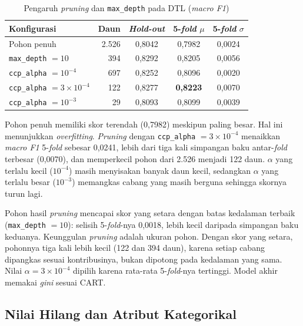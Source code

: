 \begin{table}[H]
	\centering
	\caption{Pengaruh \textit{pruning} dan \texttt{max\_depth} pada DTL (\textit{macro F1})}
	\label{tab:dtl-pruning}
	\begin{tabular}{l r c c c}
		\toprule
		\textbf{Konfigurasi} & \textbf{Daun} & \textbf{\textit{Hold-out}} & \textbf{5-\textit{fold} $\mu$} & \textbf{5-\textit{fold} $\sigma$} \\
		\midrule
		Pohon penuh                                  & 2.526 & 0,8042 & 0,7982 & 0,0024 \\
		\texttt{max\_depth} $=10$                     & 394   & 0,8292 & 0,8205 & 0,0056 \\
		\midrule
		\texttt{ccp\_alpha} $=10^{-4}$                & 697   & 0,8252 & 0,8096 & 0,0020 \\
		\texttt{ccp\_alpha} $=3\times10^{-4}$         & 122   & 0,8277 & \textbf{0,8223} & 0,0070 \\
		\texttt{ccp\_alpha} $=10^{-3}$                & 29    & 0,8093 & 0,8099 & 0,0039 \\
		\bottomrule
	\end{tabular}
\end{table}

Pohon penuh memiliki skor terendah (0,7982) meskipun paling besar. Hal ini
menunjukkan \textit{overfitting}. \textit{Pruning} dengan
\texttt{ccp\_alpha} $=3\times10^{-4}$ menaikkan \textit{macro F1} 5-\textit{fold}
sebesar 0,0241, lebih dari tiga kali simpangan baku antar-\textit{fold} terbesar (0,0070), dan
memperkecil pohon dari 2.526 menjadi 122 daun. $\alpha$ yang terlalu kecil
($10^{-4}$) masih menyisakan banyak daun kecil, sedangkan $\alpha$ yang terlalu
besar ($10^{-3}$) memangkas cabang yang masih berguna sehingga skornya turun lagi.

Pohon hasil \textit{pruning} mencapai skor yang setara dengan batas kedalaman
terbaik (\texttt{max\_depth} $=10$): selisih 5-\textit{fold}-nya 0,0018, lebih kecil
daripada simpangan baku keduanya. Keunggulan \textit{pruning} adalah ukuran pohon.
Dengan skor yang setara, pohonnya tiga kali lebih kecil (122 dan 394 daun), karena
setiap cabang dipangkas sesuai kontribusinya, bukan dipotong pada kedalaman yang
sama. Nilai $\alpha=3\times10^{-4}$ dipilih karena rata-rata 5-\textit{fold}-nya
tertinggi. Model akhir memakai \textit{gini} sesuai CART.

\subsection{Nilai Hilang dan Atribut Kategorikal}

